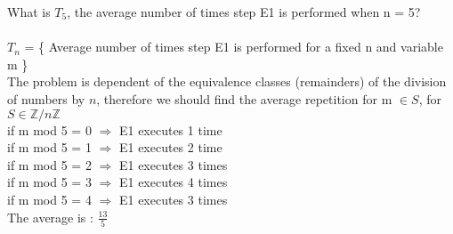 \documentclass{article}
\begin{document}
What is $T_5$, the average number of times step E1 is performed when n = 5?
\\\\
$T_n$ = \{ Average number of times step E1 is 
performed for a fixed n and variable m \}
\\
The problem is dependent of the equivalence classes (remainders) of
the division of numbers by $n$, therefore  we should find the average
repetition for m $\in S$, for $S \in \mathbb{Z}/n\mathbb{Z}$\\


\noindent if m mod 5 = 0 $\Rightarrow$ E1 executes 1 time\\
if m mod 5 = 1 $\Rightarrow$ E1 executes 2 time\\
if m mod 5 = 2 $\Rightarrow$ E1 executes 3 times\\
if m mod 5 = 3 $\Rightarrow$ E1 executes 4 times\\
if m mod 5 = 4 $\Rightarrow$ E1 executes 3 times\\
The average is : $\frac{13}{5}$
\end{document}
